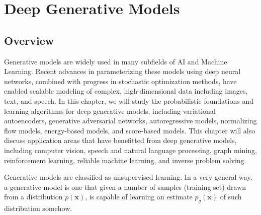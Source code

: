 ﻿


\newcommand{\D}{\mathcal{D}}
\newcommand{\KL}[2]{D_\mathrm{KL}\paren{#1 \mathbin{\|} #2}}
\renewcommand{\P}{\mathcal{P}}
\newcommand{\X}{\mathcal{X}}
\newcommand{\Z}{\mathcal{Z}}
\newcommand{\Q}{\mathcal{Q}}
\newcommand{\bx}{\mathbf{x}}
\newcommand{\M}{\mathcal{B}}
\newcommand{\ELBO}{\mathrm{ELBO}}
\newcommand{\bz}{\mathbf{z}}
\newcommand{\giv}{\mid}
\newcommand{\paren}[1]{\left(#1\right)}
\newcommand{\brac}[1]{\left[#1\right]}
\newcommand{\veps}{\varepsilon}
\newcommand{\set}[1]{\left\{#1\right\}}
\renewcommand{\d}{\mathop{}\!\mathrm{d}}
\newcommand{\Expect}{\mathbb{E}}
\newcommand{\Normal}{\mathcal{N}}
\newcommand{\I}{\mathbf{I}}
\newcommand{\0}{\mathbf{0}}


\chapter{Deep Generative Models}
\setcounter{section}{-1}

\section{Overview}

Generative models are widely used in many subfields of AI and Machine Learning. Recent 
advances in parameterizing these models using deep neural networks, combined with 
progress in stochastic optimization methods, have enabled scalable modeling of complex, 
high-dimensional data including images, text, and speech. In this chapter, we will 
study the probabilistic foundations and learning algorithms for deep generative models, 
including variational autoencoders, generative adversarial networks, autoregressive 
models, normalizing flow models, energy-based models, and score-based models. This 
chapter will also discuss application areas that have benefitted from deep generative 
models, including computer vision, speech and natural language processing, graph mining, 
reinforcement learning, reliable machine learning, and inverse problem solving.

Generative models are classified as unsupervised learning. In a very general way, a
generative model is one that given a number of samples (training set) drawn from a 
distribution $p(\bx)$, is capable of learning an estimate $p_g(\bx)$ of such distribution 
somehow.

